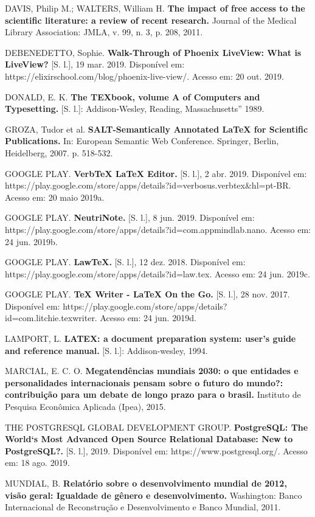 \documentclass[article,12pt,oneside,a4paper,english,brazil,sumario=tradicional]{abntex2}
\begin{document}
DAVIS, Philip M.; WALTERS, William H. \textbf{The impact of free access to the scientific literature: a review of recent research.} Journal of the Medical Library Association: JMLA, v. 99, n. 3, p. 208, 2011.

DEBENEDETTO, Sophie. \textbf{Walk-Through of Phoenix LiveView: What is LiveView?} [S. l.], 19 mar. 2019. Disponível em: https://elixirschool.com/blog/phoenix-live-view/. Acesso em: 20 out. 2019.

DONALD, E. K. \textbf{The TEXbook, volume A of Computers and Typesetting.} [S. l.]: Addison-Wesley, Reading, Massachusetts” 1989.

GROZA, Tudor et al. \textbf{SALT-Semantically Annotated {LaTeX} for Scientific Publications.} In: European Semantic Web Conference. Springer, Berlin, Heidelberg, 2007. p. 518-532.

GOOGLE PLAY. \textbf{VerbTeX LaTeX Editor.} [S. l.], 2 abr. 2019. Disponível em: https://play.google.com/store/apps/details?id=verbosus.verbtex&hl=pt-BR. Acesso em: 20 maio 2019a.

GOOGLE PLAY. \textbf{NeutriNote.} [S. l.], 8 jun. 2019. Disponível em: https://play.google.com/store/apps/details?id=com.appmindlab.nano. Acesso em: 24 jun. 2019b.

GOOGLE PLAY. \textbf{LawTeX.} [S. l.], 12 dez. 2018. Disponível em: https://play.google.com/store/apps/details?id=law.tex. Acesso em: 24 jun. 2019c.

GOOGLE PLAY. \textbf{TeX Writer - LaTeX On the Go.} [S. l.], 28 nov. 2017. Disponível em: https://play.google.com/store/apps/details?id=com.litchie.texwriter. Acesso em: 24 jun. 2019d.

LAMPORT, L. \textbf{LATEX: a document preparation system: user’s guide and reference manual.} [S. l.]: Addison-wesley, 1994.

MARCIAL, E. C. O. \textbf{Megatendências mundiais 2030: o que entidades e personalidades internacionais pensam sobre o futuro do mundo?: contribuição para um debate de longo prazo para o brasil.} Instituto de Pesquisa Econômica Aplicada (Ipea), 2015.

THE POSTGRESQL GLOBAL DEVELOPMENT GROUP. \textbf{PostgreSQL: The World‘s Most Advanced Open Source Relational Database: New to PostgreSQL?.} [S. l.], 2019. Disponível em: https://www.postgresql.org/. Acesso em: 18 ago. 2019.

MUNDIAL, B. \textbf{Relatório sobre o desenvolvimento mundial de 2012, visão geral: Igualdade de gênero e desenvolvimento.} Washington: Banco Internacional de Reconstrução e Desenvolvimento e Banco Mundial, 2011.
\end{document}
